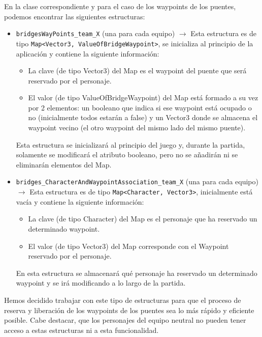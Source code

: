 En la clase correspondiente y para el caso de los waypoints de los puentes, podemos encontrar las siguientes estructuras:
\begin{itemize}
	\item \texttt{bridgesWayPoints\_team\_X} (una para cada equipo) $\rightarrow$ Esta estructura es de tipo \texttt{Map<Vector3, ValueOfBridgeWaypoint>}, se inicializa al principio de la aplicación y contiene la siguiente información:
		\begin{itemize}
			\item La clave (de tipo Vector3) del Map es el waypoint del puente que será reservado por el personaje.
			\item El valor (de tipo ValueOfBridgeWaypoint) del Map está formado a su vez por 2 elementos: un booleano que indica si ese waypoint está ocupado o no (inicialmente todos estarán a false) y un Vector3 donde se almacena el waypoint vecino (el otro waypoint del mismo lado del mismo puente).
		\end{itemize}
		Esta estructura se inicializará al principio del juego y, durante la partida, solamente se modificará el atributo booleano, pero no se añadirán ni se eliminarán elementos del Map.
	\item \texttt{bridges\_CharacterAndWaypointAssociation\_team\_X} (una para cada equipo) $\rightarrow$ Esta estructura es de tipo \texttt{Map<Character, Vector3>}, inicialmente está vacía y contiene la siguiente información:
	\begin{itemize}
		\item La clave (de tipo Character) del Map es el personaje que ha reservado un determinado waypoint.
		\item El valor (de tipo Vector3) del Map corresponde con el Waypoint reservado por el personaje.
	\end{itemize}
	En esta estructura se almacenará qué personaje ha reservado un determinado waypoint y se irá modificando a lo largo de la partida.
\end{itemize}

Hemos decidido trabajar con este tipo de estructuras para que el proceso de reserva y liberación de los waypoints de los puentes sea lo más rápido y eficiente posible. Cabe destacar, que los personajes del equipo neutral no pueden tener acceso a estas estructuras ni a esta funcionalidad. \\

